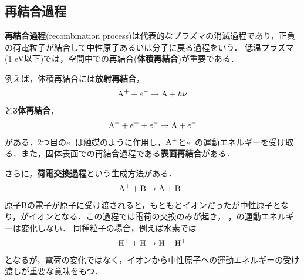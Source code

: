 \documentclass{report}
\begin{document}
    \subsection{再結合過程}
      \textbf{再結合過程}(recombination process)は代表的なプラズマの消滅過程であり，正負の荷電粒子が結合して中性原子あるいは分子に戻る過程をいう．
      低温プラズマ(1 eV以下)では，空間中での再結合(\textbf{体積再結合})が重要である．
      \par
      例えば，体積再結合には\textbf{放射再結合}，
      \begin{align}
        \ce{A}^+ + e^- \rightarrow \ce{A} + h\nu
      \end{align}
      と\textbf{3体再結合}，
      \begin{align}
        \ce{A}^+ + e^- + e^- \rightarrow \ce{A} + e^-
      \end{align}
      がある．2つ目の$e^-$は触媒のように作用し，$\ce{A}^+$と$e^-$の運動エネルギーを受け取る．また，固体表面での再結合過程である\textbf{表面再結合}がある．
      \par
      さらに，\textbf{荷電交換過程}という生成方法がある．
      \begin{align}
        \ce{A}^+ + \ce{B} \rightarrow \ce{A} + \ce{B}^+
      \end{align}
      原子Bの電子が原子に受け渡されると，もともとイオンだったが中性原子となり，がイオンとなる．この過程では電荷の交換のみが起き，
      ，の運動エネルギーは変化しない．
      同種粒子の場合，例えば水素では
      \begin{align}
        \ce{H}^+ + \ce{H} \rightarrow \ce{H} + \ce{H}^+
      \end{align}
      となるが，電荷の変化ではなく，イオンから中性原子への運動エネルギーの受け渡しが重要な意味をもつ．
\end{document}
